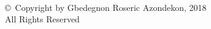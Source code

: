 \clearpage
\cfoot{\thepage}
\thispagestyle{plain}
\hbox{\ }

\vfill
\renewcommand{\baselinestretch}{1}
\small\normalsize

\vspace{-.65in}

\begin{center}
\large{\copyright \hbox{ }Copyright by Gbedegnon Roseric Azondekon, 2018\\
All Rights Reserved
}
\end{center}

\vfill
